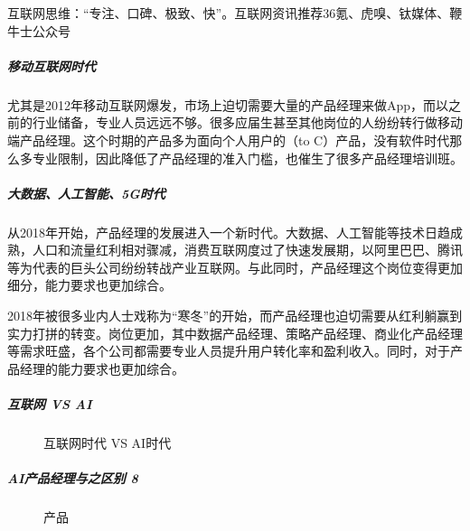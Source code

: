 \documentclass[letterpaper,11pt,english]{sphinxmanual}
\begin{document}
互联网思维：“专注、口碑、极致、快”。互联网资讯推荐36氪、虎嗅、钛媒体、鞭牛士公众号


\subparagraph{移动互联网时代}
\label{\detokenize{chapter_introduction/AI_PM:id4}}
尤其是2012年移动互联网爆发，市场上迫切需要大量的产品经理来做App，而以之前的行业储备，专业人员远远不够。很多应届生甚至其他岗位的人纷纷转行做移动端产品经理。这个时期的产品多为面向个人用户的（to
C）产品，没有软件时代那么多专业限制，因此降低了产品经理的准入门槛，也催生了很多产品经理培训班。


\subparagraph{大数据、人工智能、5G时代}
\label{\detokenize{chapter_introduction/AI_PM:g}}
从2018年开始，产品经理的发展进入一个新时代。大数据、人工智能等技术日趋成熟，人口和流量红利相对骤减，消费互联网度过了快速发展期，以阿里巴巴、腾讯等为代表的巨头公司纷纷转战产业互联网。与此同时，产品经理这个岗位变得更加细分，能力要求也更加综合。

2018年被很多业内人士戏称为“寒冬”的开始，而产品经理也迫切需要从红利躺赢到实力打拼的转变。岗位更加，其中数据产品经理、策略产品经理、商业化产品经理等需求旺盛，各个公司都需要专业人员提升用户转化率和盈利收入。同时，对于产品经理的能力要求也更加综合。


\subparagraph{互联网 VS AI}
\label{\detokenize{chapter_introduction/AI_PM:vs-ai}}
\begin{figure}[H]
\centering
\capstart

\noindent{}
\caption{互联网时代 VS AI时代\sphinxfootnotemark[219]}\label{\detokenize{chapter_introduction/AI_PM:id47}}\end{figure}
%
\begin{footnotetext}[219]\sphinxAtStartFootnote
{}
%
\end{footnotetext}\ignorespaces 

\subparagraph{AI产品经理与之区别 8\sphinxfootnotemark[220]}
\label{\detokenize{chapter_introduction/AI_PM:ai-8}}%
\begin{footnotetext}[220]\sphinxAtStartFootnote
{}
%
\end{footnotetext}\ignorespaces 
\begin{figure}[H]
\centering
\capstart

\noindent{}
\caption{产品}\label{\detokenize{chapter_introduction/AI_PM:id48}}\end{figure}
\end{document}
